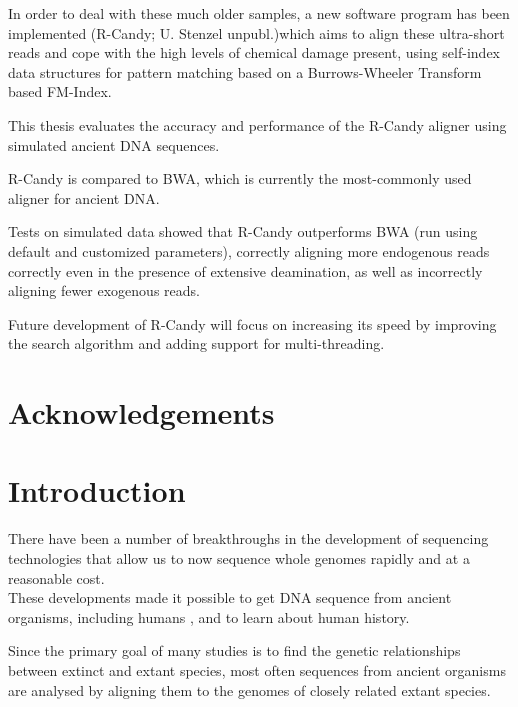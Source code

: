 \documentclass[11pt,a4paper]{report}
\begin{document}
In order to deal with these much older samples, a new software program 
has been implemented (R-Candy; U. Stenzel unpubl.)which aims to align 
these ultra-short reads and cope with the high levels of chemical damage 
present, using self-index data structures for pattern matching based on 
a Burrows-Wheeler Transform based FM-Index.

This thesis evaluates the accuracy and performance of the R-Candy aligner 
using simulated ancient DNA sequences. 

R-Candy is compared to BWA, which is currently the most-commonly used 
aligner for ancient DNA.

Tests on simulated data showed that R-Candy outperforms BWA (run using 
default and customized parameters), correctly aligning more endogenous 
reads correctly even in the presence of extensive deamination, as well
as incorrectly aligning fewer exogenous reads.

Future development of R-Candy will focus on increasing its speed by 
improving the search algorithm and adding support for multi-threading.

\newpage\null\thispagestyle{empty}\newpage
\section*{Acknowledgements}
\newpage\null\thispagestyle{empty}\newpage

\tableofcontents
\newpage
\listoftables
\newpage
\listoffigures
\newpage




\section{Introduction} \label{Introduction}


There have been a number of breakthroughs in the development of sequencing 
technologies that allow us to now sequence whole genomes rapidly and at a 
reasonable cost\cite{NGS}\cite{454}\cite{NGS2}.
\\
These developments made it possible to get DNA sequence from ancient 
organisms, including humans \cite{AncientDNA}\cite{fish2human}, and  
to learn about human history\cite{impactOFhg}\cite{ourGenome}\cite{SNP}.

Since the primary goal of many studies is to find the genetic 
relationships between extinct and extant species, most often sequences 
from ancient organisms are analysed by aligning them to the genomes of 
closely related extant species\cite{Neanthertal}\cite{AncientDNA}.
\end{document}
